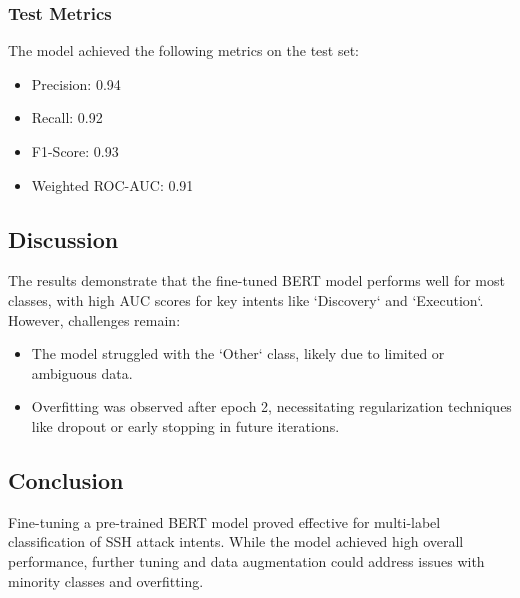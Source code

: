 \subsubsection*{Test Metrics}
The model achieved the following metrics on the test set:
\begin{itemize}
    \item Precision: 0.94
    \item Recall: 0.92
    \item F1-Score: 0.93
    \item Weighted ROC-AUC: 0.91
\end{itemize}

\subsection*{Discussion}
The results demonstrate that the fine-tuned BERT model performs well for most classes, with high AUC scores for key intents like `Discovery` and `Execution`. However, challenges remain:
\begin{itemize}
    \item The model struggled with the `Other` class, likely due to limited or ambiguous data.
    \item Overfitting was observed after epoch 2, necessitating regularization techniques like dropout or early stopping in future iterations.
\end{itemize}

\subsection*{Conclusion}
Fine-tuning a pre-trained BERT model proved effective for multi-label classification of SSH attack intents. While the model achieved high overall performance, further tuning and data augmentation could address issues with minority classes and overfitting.
